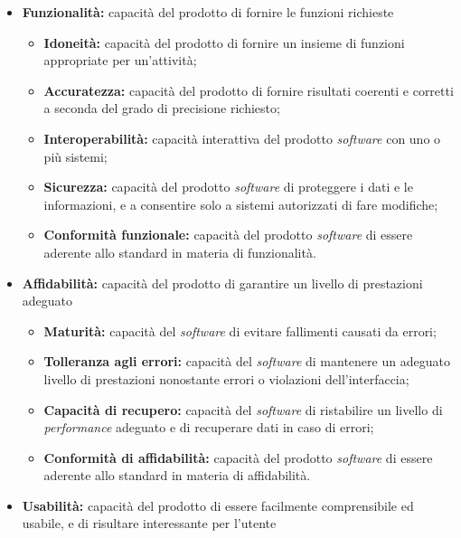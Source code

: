 \begin{itemize}
	\item \textbf{Funzionalità:} capacità del prodotto di fornire le funzioni richieste
	\begin{itemize}
		\item \textbf{Idoneità:} capacità del prodotto di fornire un insieme di funzioni appropriate per un'attività;
		\item \textbf{Accuratezza:} capacità del prodotto di fornire risultati 
		coerenti e corretti a seconda del grado di precisione richiesto;
		\item \textbf{Interoperabilità:} capacità interattiva del prodotto 
		\textit{software} con uno o più sistemi;
		\item \textbf{Sicurezza:} capacità del prodotto \textit{software} di 
		proteggere i dati e le informazioni, e a consentire solo a sistemi 
		autorizzati di fare modifiche;
		\item \textbf{Conformità funzionale:} capacità del prodotto 
		\textit{software} di essere aderente allo standard in materia di 
		funzionalità.
	\end{itemize} 
	
	\item \textbf{Affidabilità:} capacità del prodotto di garantire un livello di prestazioni adeguato
	\begin{itemize}
		\item \textbf{Maturità:} capacità del \textit{software} di evitare 
		fallimenti causati da errori;
		\item \textbf{Tolleranza agli errori:} capacità del \textit{software} 
		di mantenere un adeguato livello di prestazioni nonostante errori o 
		violazioni dell'interfaccia;
		\item \textbf{Capacità di recupero:} capacità del \textit{software} di 
		ristabilire un livello di \textit{performance} adeguato e di recuperare 
		dati in caso di errori;
		\item \textbf{Conformità di affidabilità:} capacità del prodotto 
		\textit{software} di essere aderente allo standard in materia di 
		affidabilità.
	\end{itemize}
	
	\item \textbf{Usabilità:} capacità del prodotto di essere facilmente comprensibile ed usabile, e di risultare interessante per l'utente
	

\end{itemize}
